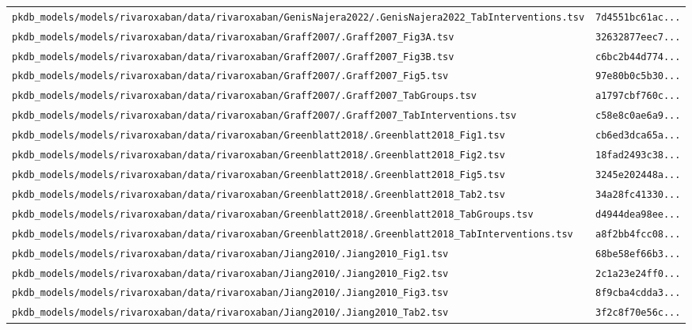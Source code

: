 \begin{longtable}{ll}
\texttt{pkdb\_models/models/rivaroxaban/data/rivaroxaban/GenisNajera2022/.GenisNajera2022\_TabInterventions.tsv} & \texttt{7d4551bc61ac...} \\
\texttt{pkdb\_models/models/rivaroxaban/data/rivaroxaban/Graff2007/.Graff2007\_Fig3A.tsv} & \texttt{32632877eec7...} \\
\texttt{pkdb\_models/models/rivaroxaban/data/rivaroxaban/Graff2007/.Graff2007\_Fig3B.tsv} & \texttt{c6bc2b44d774...} \\
\texttt{pkdb\_models/models/rivaroxaban/data/rivaroxaban/Graff2007/.Graff2007\_Fig5.tsv} & \texttt{97e80b0c5b30...} \\
\texttt{pkdb\_models/models/rivaroxaban/data/rivaroxaban/Graff2007/.Graff2007\_TabGroups.tsv} & \texttt{a1797cbf760c...} \\
\texttt{pkdb\_models/models/rivaroxaban/data/rivaroxaban/Graff2007/.Graff2007\_TabInterventions.tsv} & \texttt{c58e8c0ae6a9...} \\
\texttt{pkdb\_models/models/rivaroxaban/data/rivaroxaban/Greenblatt2018/.Greenblatt2018\_Fig1.tsv} & \texttt{cb6ed3dca65a...} \\
\texttt{pkdb\_models/models/rivaroxaban/data/rivaroxaban/Greenblatt2018/.Greenblatt2018\_Fig2.tsv} & \texttt{18fad2493c38...} \\
\texttt{pkdb\_models/models/rivaroxaban/data/rivaroxaban/Greenblatt2018/.Greenblatt2018\_Fig5.tsv} & \texttt{3245e202448a...} \\
\texttt{pkdb\_models/models/rivaroxaban/data/rivaroxaban/Greenblatt2018/.Greenblatt2018\_Tab2.tsv} & \texttt{34a28fc41330...} \\
\texttt{pkdb\_models/models/rivaroxaban/data/rivaroxaban/Greenblatt2018/.Greenblatt2018\_TabGroups.tsv} & \texttt{d4944dea98ee...} \\
\texttt{pkdb\_models/models/rivaroxaban/data/rivaroxaban/Greenblatt2018/.Greenblatt2018\_TabInterventions.tsv} & \texttt{a8f2bb4fcc08...} \\
\texttt{pkdb\_models/models/rivaroxaban/data/rivaroxaban/Jiang2010/.Jiang2010\_Fig1.tsv} & \texttt{68be58ef66b3...} \\
\texttt{pkdb\_models/models/rivaroxaban/data/rivaroxaban/Jiang2010/.Jiang2010\_Fig2.tsv} & \texttt{2c1a23e24ff0...} \\
\texttt{pkdb\_models/models/rivaroxaban/data/rivaroxaban/Jiang2010/.Jiang2010\_Fig3.tsv} & \texttt{8f9cba4cdda3...} \\
\texttt{pkdb\_models/models/rivaroxaban/data/rivaroxaban/Jiang2010/.Jiang2010\_Tab2.tsv} & \texttt{3f2c8f70e56c...} \\

\end{longtable}

